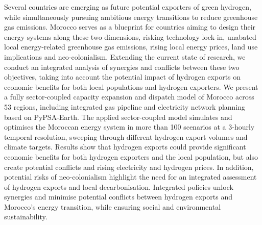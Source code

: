 Several countries are emerging as future potential exporters of green hydrogen, while simultaneously pursuing ambitious energy transitions to reduce greenhouse gas emissions. 
Morocco serves as a blueprint for countries aiming to design their energy systems along these two dimensions, risking technology lock-in, unabated local energy-related greenhouse gas emissions, rising local energy prices, land use implications and neo-colonialism. 
Extending the current state of research, we conduct an integrated analysis of synergies and conflicts between these two objectives, taking into account the potential impact of hydrogen exports on economic benefits for both local populations and hydrogen exporters. We present a fully sector-coupled capacity expansion and dispatch model of Morocco across 53 regions, including integrated gas pipeline and electricity network planning based on PyPSA-Earth. The applied sector-coupled model simulates and optimises the Moroccan energy system in more than 100 scenarios at a 3-hourly temporal resolution, sweeping through different hydrogen export volumes and climate targets. 
Results show that hydrogen exports could provide significant economic benefits for both hydrogen exporters and the local population, but also create potential conflicts and rising electricity and hydrogen prices.
In addition, potential risks of neo-colonialism highlight the need for an integrated assessment of hydrogen exports and local decarbonisation. Integrated policies unlock synergies and minimise potential conflicts between hydrogen exports and Morocco's energy transition, while ensuring social and environmental sustainability.